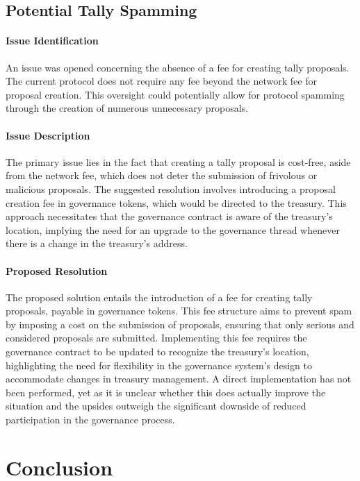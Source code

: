 \documentclass[11pt]{article}
\begin{document}
\subsection{Potential Tally Spamming}

\paragraph{Issue Identification}
An issue was opened concerning the absence of a fee for creating tally proposals.
The current protocol does not require any fee beyond the network fee for proposal creation.
This oversight could potentially allow for protocol spamming through the creation of numerous unnecessary proposals.

\paragraph{Issue Description}
The primary issue lies in the fact that creating a tally proposal is cost-free, aside from the network fee, which does not deter the submission of frivolous or malicious proposals.
The suggested resolution involves introducing a proposal creation fee in governance tokens, which would be directed to the treasury.
This approach necessitates that the governance contract is aware of the treasury's location, implying the need for an upgrade to the governance thread whenever there is a change in the treasury's address.

\paragraph{Proposed Resolution}
The proposed solution entails the introduction of a fee for creating tally proposals, payable in governance tokens.
This fee structure aims to prevent spam by imposing a cost on the submission of proposals, ensuring that only serious and considered proposals are submitted.
Implementing this fee requires the governance contract to be updated to recognize the treasury's location, highlighting the need for flexibility in the governance system's design to accommodate changes in treasury management.
A direct implementation has not been performed, yet as it is unclear whether this does actually improve the situation
and the upsides outweigh the significant downside of reduced participation in the governance process.


\section{Conclusion}
\end{document}
